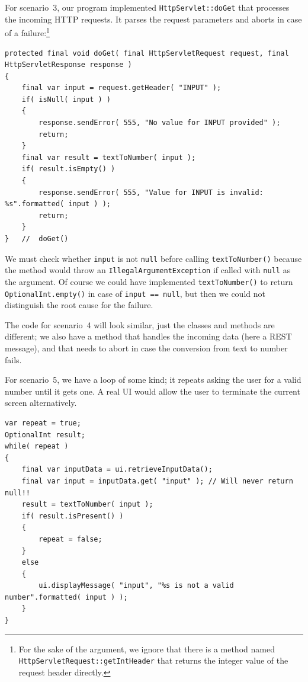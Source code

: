 For scenario~3, our program implemented \lstinline|HttpServlet::doGet| \autocite{JAKARTA_EE_HTTPSERVLET_CLASS,JAKARTA_EE_HTTPSERVLET::doGet} that processes the incoming HTTP requests. It parses the request parameters and aborts in case of a failure:\footnote{For the sake of the argument, we ignore that there is a method named \lstinline|HttpServletRequest::getIntHeader| \autocite{JAKARTA_EE_HTTPSERVLETREQUEST_CLASS,JAKARTA_EE_HTTPSERVLETREQUEST::getHeader,JAKARTA_EE_HTTPSERVLETREQUEST::getIntHeader} that returns the integer value of the request header directly.}
\begin{lstlisting}
protected final void doGet( final HttpServletRequest request, final HttpServletResponse response )
{
    final var input = request.getHeader( "INPUT" );
    if( isNull( input ) )
    {
        response.sendError( 555, "No value for INPUT provided" );
        return;
    }
    final var result = textToNumber( input );
    if( result.isEmpty() ) 
    {
        response.sendError( 555, "Value for INPUT is invalid: %s".formatted( input ) );
        return;
    }
}   //  doGet()
\end{lstlisting}
We must check whether \lstinline|input| is not \lstinline|null| before calling \lstinline|textToNumber()| because the method would throw an \lstinline|IllegalArgumentException| \autocite{ORACLE_DOC_ILLEGALARGUMENTEXCEPTION_CLASS} if called with \lstinline|null| as the argument. Of course we could have implemented \lstinline|textToNumber()| to return \lstinline|OptionalInt.empty()| \autocite{ORACLE_DOC_OPTIONALINT:empty} in case of \lstinline|input == null|, but then we could not distinguish the root cause for the failure.

The code for scenario~4 will look similar, just the classes and methods are different; we also have a method that handles the incoming data (here a REST message), and that needs to abort in case the conversion from text to number fails.

For scenario~5, we have a loop of some kind; it repeats asking the user for a valid number until it gets one. A real UI would allow the user to terminate the current screen alternatively.
\begin{lstlisting}
var repeat = true; 
OptionalInt result;
while( repeat )
{
    final var inputData = ui.retrieveInputData();
    final var input = inputData.get( "input" ); // Will never return null!!
    result = textToNumber( input );
    if( result.isPresent() ) 
    {
        repeat = false;
    }
    else
    { 
        ui.displayMessage( "input", "%s is not a valid number".formatted( input ) );
    }
}
\end{lstlisting}

